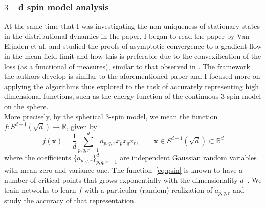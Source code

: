 \documentclass{article}
\theoremstyle{mystyle}
\begin{document}
\newpage
\subsubsection{$ 3-$d spin model analysis}

At the same time that I was investigating the non-uniqueness of stationary states in the distributional dynamics in the \cite{Mei_2018} paper, I began to read the paper by Van Eijnden et al. \cite{Rotskoff_2022} and studied the proofs of asymptotic convergence to a gradient flow in the mean field limit and how this is preferable due to the convexification of the loss (as a functional of measures), similar to that observed in \cite{Mei_2018}. The framework the authors develop is similar to the aforementioned paper and I focused more on applying the algorithms thus explored to the task of accurately representing high dimensional functions, such as the energy function of the continuous 3-spin model on the sphere.\\

More precisely, by the spherical 3-spin model, we mean the function
$f: S^{d-1}(\sqrt{d}) \to \mathbb{R}$, given by
\begin{equation}
  \label{eq:psin}
  f(\mathbf{x}) = \frac1d \sum_{p,q,r=1}^d a_{p,q,r} x_p x_q x_r,  \qquad \mathbf{x}
  \in S^{d-1}(\sqrt{d}) \subset \mathbb{R}^d
\end{equation}
where the coefficients $\{a_{p,q,r}\}_{p,q,r=1}^d$ are independent
Gaussian random variables with mean zero and variance one. The
function~\eqref{eq:psin} is known to have a number of critical points
that grows exponentially with the dimensionality
$d$~\cite{Rotskoff_2022}. We train networks to learn $f$ with a
particular (random) realization of $a_{p,q,r}$ and study the accuracy of that
representation.
\end{document}
